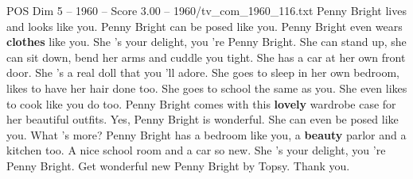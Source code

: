 \begin{textsample}{POS Dim 5 – 1960 – Score 3.00 – 1960/tv\_com\_1960\_116.txt}  \label{ex:f5_pos_082}
Penny Bright lives and looks like you.
Penny Bright can be posed like you.
Penny Bright even wears \textbf{clothes} like you.
She 's your delight, you 're Penny Bright.
She can stand up, she can sit down, bend her arms and cuddle you tight.
She has a car at her own front door.
She 's a real doll that you 'll adore.
She goes to sleep in her own bedroom, likes to have her hair done too.
She goes to school the same as you.
She even likes to cook like you do too.
Penny Bright comes with this \textbf{lovely} wardrobe case for her beautiful outfits.
Yes, Penny Bright is wonderful.
She can even be posed like you.
What 's more?
Penny Bright has a bedroom like you, a \textbf{beauty} parlor and a kitchen too.
A nice school room and a car so new.
She 's your delight, you 're Penny Bright.
Get wonderful new Penny Bright by Topsy.
Thank you.

\end{textsample}
